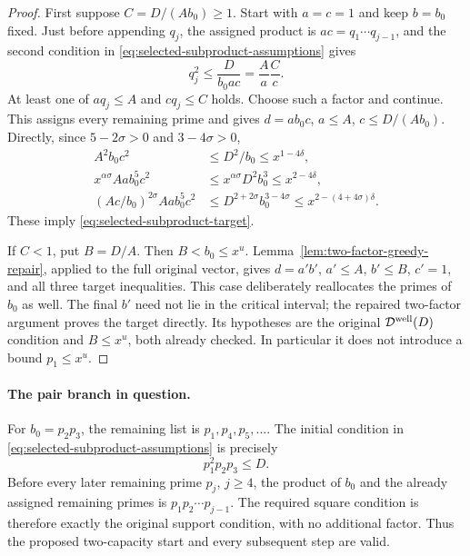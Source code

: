 \documentclass[11pt]{article}
\begin{document}
\begin{proof}
First suppose $C=D/(A b_0)\ge1$.  Start with $a=c=1$ and keep
$b=b_0$ fixed.  Just before appending $q_j$, the assigned product is
$ac=q_1\cdots q_{j-1}$, and the second condition in
\eqref{eq:selected-subproduct-assumptions} gives
\[
 q_j^2\le\frac{D}{b_0ac}=\frac A a\frac C c.
\]
At least one of $a q_j\le A$ and $c q_j\le C$ holds.  Choose such
a factor and continue.  This assigns every remaining prime and gives
$d=ab_0c$, $a\le A$, $c\le D/(A b_0)$.
Directly, since $5-2\sigma>0$ and $3-4\sigma>0$,
\begin{align*}
 A^2b_0c^2&\le D^2/b_0\le x^{1-4\delta},\\
 x^{\alpha\sigma}Aa b_0^5c^2
   &\le x^{\alpha\sigma}D^2b_0^3\le x^{2-4\delta},\\
 (Ac/b_0)^{2\sigma}Aa b_0^5c^2
   &\le D^{2+2\sigma}b_0^{3-4\sigma}
    \le x^{2-(4+4\sigma)\delta}.
\end{align*}
These imply \eqref{eq:selected-subproduct-target}.

If $C<1$, put $B=D/A$.  Then $B<b_0\le x^u$.
Lemma~\ref{lem:two-factor-greedy-repair}, applied to the full original
vector, gives $d=a'b'$, $a'\le A$, $b'\le B$, $c'=1$, and all three
target inequalities.  This case deliberately reallocates the primes
of $b_0$ as well.  The final $b'$ need not lie in the critical interval;
the repaired two-factor argument proves the target directly.
Its hypotheses are the original $\mathcal D^{\rm well}(D)$ condition
and $B\le x^u$, both already checked.  In particular it does not
introduce a bound $p_1\le x^u$.
\end{proof}

\paragraph{The pair branch in question.}
For $b_0=p_2p_3$, the remaining list is $p_1,p_4,p_5,\ldots$.
The initial condition in \eqref{eq:selected-subproduct-assumptions}
is precisely
\[
 p_1^2p_2p_3\le D.
\]
Before every later remaining prime $p_j$, $j\ge4$, the product of
$b_0$ and the already assigned remaining primes is
$p_1p_2\cdots p_{j-1}$.  The required square condition is therefore
exactly the original support condition, with no additional factor.
Thus the proposed two-capacity start and every subsequent step are valid.
\end{document}
